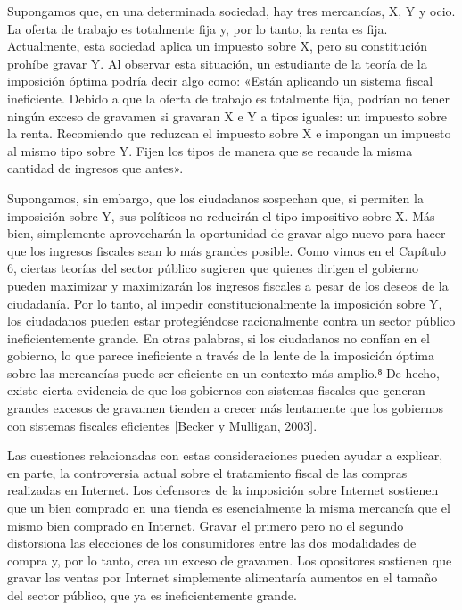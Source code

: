 \documentclass[10pt,a4paper]{article}
\begin{document}
Supongamos que, en una determinada sociedad, hay tres mercancías, X, Y y ocio. La oferta de trabajo es totalmente fija y, por lo tanto, la renta es fija. Actualmente, esta sociedad aplica un impuesto sobre X, pero su constitución prohíbe gravar Y. Al observar esta situación, un estudiante de la teoría de la imposición óptima podría decir algo como: «Están aplicando un sistema fiscal ineficiente. Debido a que la oferta de trabajo es totalmente fija, podrían no tener ningún exceso de gravamen si gravaran X e Y a tipos iguales: un impuesto sobre la renta. Recomiendo que reduzcan el impuesto sobre X e impongan un impuesto al mismo tipo sobre Y. Fijen los tipos de manera que se recaude la misma cantidad de ingresos que antes».

Supongamos, sin embargo, que los ciudadanos sospechan que, si permiten la imposición sobre Y, sus políticos no reducirán el tipo impositivo sobre X. Más bien, simplemente aprovecharán la oportunidad de gravar algo nuevo para hacer que los ingresos fiscales sean lo más grandes posible. Como vimos en el Capítulo 6, ciertas teorías del sector público sugieren que quienes dirigen el gobierno pueden maximizar y maximizarán los ingresos fiscales a pesar de los deseos de la ciudadanía. Por lo tanto, al impedir constitucionalmente la imposición sobre Y, los ciudadanos pueden estar protegiéndose racionalmente contra un sector público ineficientemente grande. En otras palabras, si los ciudadanos no confían en el gobierno, lo que parece ineficiente a través de la lente de la imposición óptima sobre las mercancías puede ser eficiente en un contexto más amplio.⁸ De hecho, existe cierta evidencia de que los gobiernos con sistemas fiscales que generan grandes excesos de gravamen tienden a crecer más lentamente que los gobiernos con sistemas fiscales eficientes [Becker y Mulligan, 2003].

Las cuestiones relacionadas con estas consideraciones pueden ayudar a explicar, en parte, la controversia actual sobre el tratamiento fiscal de las compras realizadas en Internet. Los defensores de la imposición sobre Internet sostienen que un bien comprado en una tienda es esencialmente la misma mercancía que el mismo bien comprado en Internet. Gravar el primero pero no el segundo distorsiona las elecciones de los consumidores entre las dos modalidades de compra y, por lo tanto, crea un exceso de gravamen. Los opositores sostienen que gravar las ventas por Internet simplemente alimentaría aumentos en el tamaño del sector público, que ya es ineficientemente grande.
\end{document}
